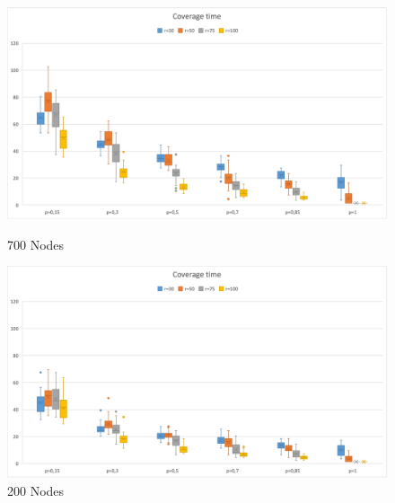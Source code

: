 \begin{figure}[H]
  \includegraphics[width=\linewidth]{./images/Time700Boxplot.png}
  \caption{700 Nodes}\label{fig:awesome_image1}
\endminipage\hfill
{}
  \includegraphics[width=\linewidth]{./images/Time200BoxplotScaled.png}
  \caption{200 Nodes}\label{fig:awesome_image2}
\endminipage
\end{figure}

